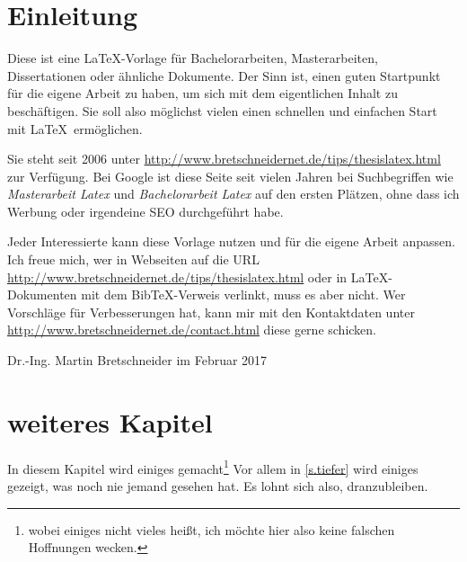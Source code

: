 \chapter{Einleitung}

Diese ist eine \LaTeX-Vorlage für Bachelorarbeiten, Masterarbeiten, Dissertationen oder ähnliche Dokumente. Der Sinn ist, einen guten Startpunkt für die eigene Arbeit zu haben, um sich mit dem eigentlichen Inhalt zu beschäftigen. Sie soll also möglichst vielen einen schnellen und einfachen Start mit \LaTeX\ ermöglichen.

Sie steht seit 2006 unter \url{http://www.bretschneidernet.de/tips/thesislatex.html} zur Verfügung.  Bei Google ist diese Seite seit vielen Jahren bei Suchbegriffen wie \textit{Masterarbeit Latex} und \textit{Bachelorarbeit Latex} auf den ersten Plätzen, ohne dass ich Werbung oder irgendeine SEO durchgeführt habe.

Jeder Interessierte kann diese Vorlage nutzen und für die eigene Arbeit anpassen. Ich freue mich, wer in Webseiten auf die URL \url{http://www.bretschneidernet.de/tips/thesislatex.html} oder in \LaTeX-Dokumenten mit dem BibTeX-Verweis\cite{thesislatex} verlinkt, muss es aber nicht. Wer Vorschläge für Verbesserungen hat, kann mir mit den Kontaktdaten unter \url{http://www.bretschneidernet.de/contact.html} diese gerne schicken.

Dr.-Ing. Martin Bretschneider im Februar 2017





\chapter{weiteres Kapitel}\label{c.weitereskapitel}
In diesem Kapitel wird einiges gemacht\footnote{wobei einiges nicht vieles heißt, ich möchte hier also keine falschen Hoffnungen wecken.} Vor allem in \autoref{s.tiefer} wird einiges gezeigt, was noch nie jemand gesehen hat. Es lohnt sich also, dranzubleiben.

